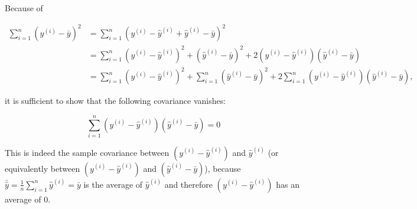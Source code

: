 {{{Because of

\begin{align*}
	\sum_{i=1}^n (y^{(i)}-\bar{y})^2 
	&= \sum_{i=1}^n (y^{(i)} - \hat{y}^{(i)} + \hat{y}^{(i)} - \bar{y})^2 \\
	&= \sum_{i=1}^n (y^{(i)} - \hat{y}^{(i)})^2 + (\hat{y}^{(i)} - \bar{y})^2 + 2(y^{(i)}-\hat{y}^{(i)})(\hat{y}^{(i)} - \bar{y}) \\
	&= \sum_{i=1}^n (y^{(i)} - \hat{y}^{(i)})^2 + \sum_{i=1}^n(\hat{y}^{(i)} - \bar{y})^2 + 2\sum_{i=1}^n(y^{(i)}-\hat{y}^{(i)})(\hat{y}^{(i)} - \bar{y}),
\end{align*}

it is sufficient to show that the following covariance vanishes:

$$
\sum_{i=1}^n (y^{(i)}-\hat{y}^{(i)}) (\hat{y}^{(i)} - \bar{y}) = 0
$$

This is indeed the sample covariance between \( (y^{(i)}-\hat{y}^{(i)}) \) and \( \hat{y}^{(i)} \) (or equivalently between \( (y^{(i)}-\hat{y}^{(i)}) \) and \( (\hat{y}^{(i)} - \bar{y}) \)), because $ \bar{\hat{y}} = \frac{1}{n} \sum_{i=1}^n \hat{y}^{(i)} = \bar{y} $ is the average of \(\hat{y}^{(i)}\) and therefore $ (y^{(i)}-\hat{y}^{(i)}) $ has an average of 0.

}}

}

